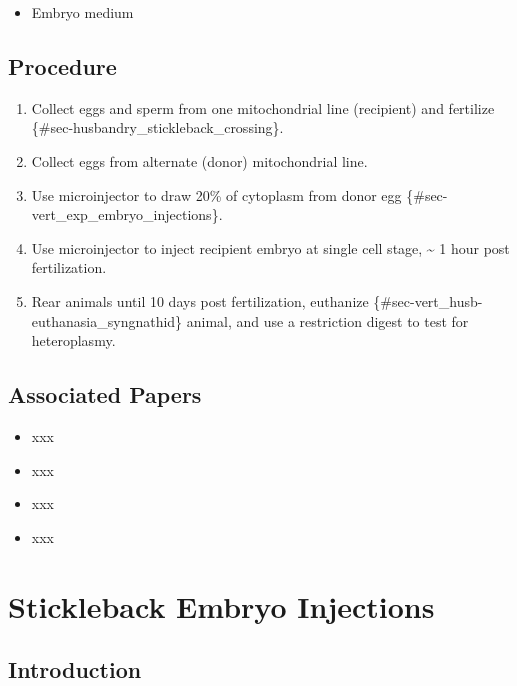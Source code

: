 \documentclass[
  letterpaper,
  DIV=11,
  numbers=noendperiod]{scrreprt}
\providecommand{\tightlist}{%
  \setlength{\itemsep}{0pt}\setlength{\parskip}{0pt}}\usepackage{longtable,booktabs,array}
\begin{document}
\begin{itemize}
\tightlist
\item
  Embryo medium
\end{itemize}

\hypertarget{procedure-69}{%
\section{Procedure}\label{procedure-69}}

\begin{enumerate}
\def\labelenumi{\arabic{enumi}.}
\tightlist
\item
  Collect eggs and sperm from one mitochondrial line (recipient) and
  fertilize \{\#sec-husbandry\_stickleback\_crossing\}.
\item
  Collect eggs from alternate (donor) mitochondrial line.
\item
  Use microinjector to draw 20\% of cytoplasm from donor egg
  \{\#sec-vert\_exp\_embryo\_injections\}.
\item
  Use microinjector to inject recipient embryo at single cell stage,
  \textasciitilde{} 1 hour post fertilization.
\item
  Rear animals until 10 days post fertilization, euthanize
  \{\#sec-vert\_husb-euthanasia\_syngnathid\} animal, and use a
  restriction digest to test for heteroplasmy.
\end{enumerate}

\hypertarget{associated-papers-47}{%
\section{Associated Papers}\label{associated-papers-47}}

\begin{itemize}
\tightlist
\item
  xxx
\item
  xxx
\item
  xxx
\item
  xxx
\end{itemize}

\hypertarget{sec-vert_exp-embryo_injections}{%
\chapter{Stickleback Embryo
Injections}\label{sec-vert_exp-embryo_injections}}

\hypertarget{introduction-75}{%
\section{Introduction}\label{introduction-75}}
\end{document}
